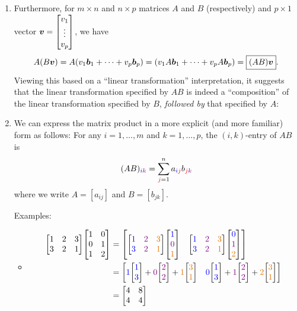 \begin{enumerate}
\item \label{it:matrix-mult-compo-trans}
Furthermore, for \(m\times n\) and \(n\times p\) matrices \(A\) and \(B\)
(respectively) and \(p\times 1\) vector \(\vect{v}=\mqty[v_1\\ \vdots\\ v_p]\), we have
\[
A(B\vb*{v})
=A(v_1\vb*{b}_{1}+\dotsb+v_p\vb*{b}_{p})
=(v_1A\vb*{b}_{1}+\dotsb+v_pA\vb*{b}_{p})
=\boxed{(AB)\vb*{v}}.
\]
Viewing this based on a ``linear transformation'' interpretation, it suggests
that the linear transformation specified by \(AB\) is indeed a ``composition''
of the linear transformation specified by \(B\), \emph{followed by} that
specified by \(A\):
\begin{center}
\end{center}
\item \label{it:matrix-mult-explicit}
We can express the matrix product in a more explicit (and more familiar)
form as follows: For any \(i=1,\dotsc,m\) and \(k=1,\dotsc,p\), the
\((i,k)\)-entry of \(AB\) is
\[
(AB)_{{\color{blue}i}{\color{violet}k}}=\sum_{{\color{red}j}=1}^{n}a_{{\color{blue}i}{\color{red}j}}b_{{\color{red}j}{\color{violet}k}}
\]
where we write \(A=[a_{ij}]\) and \(B=[b_{jk}]\). 

Examples:
\begin{itemize}
\item \begin{align*}
\mqty[1&2&3\\ 3&2&1]\mqty[1&0\\ 0&1\\ 1&2]
&=\mqty[
\mqty[\blc{1}&\vc{2}&\orc{3}\\ \blc{3}&\vc{2}&\orc{1}]\mqty[\blc{1}\\ \vc{0}\\ \orc{1}]
&\mqty[\blc{1}&\vc{2}&\orc{3}\\ \blc{3}&\vc{2}&\orc{1}]\mqty[\blc{0}\\ \vc{1}\\ \orc{2}]
]\\
&=\mqty[
\blc{1}\mqty[\blc{1}\\ \blc{3}]+\vc{0}\mqty[\vc{2}\\ \vc{2}]+\orc{1}\mqty[\orc{3}\\ \orc{1}]
&\blc{0}\mqty[\blc{1}\\ \blc{3}]+\vc{1}\mqty[\vc{2}\\ \vc{2}]+\orc{2}\mqty[\orc{3}\\ \orc{1}]
]\\
&=\mqty[4&8\\ 4&4]
\end{align*}


\end{itemize}
\end{enumerate}
